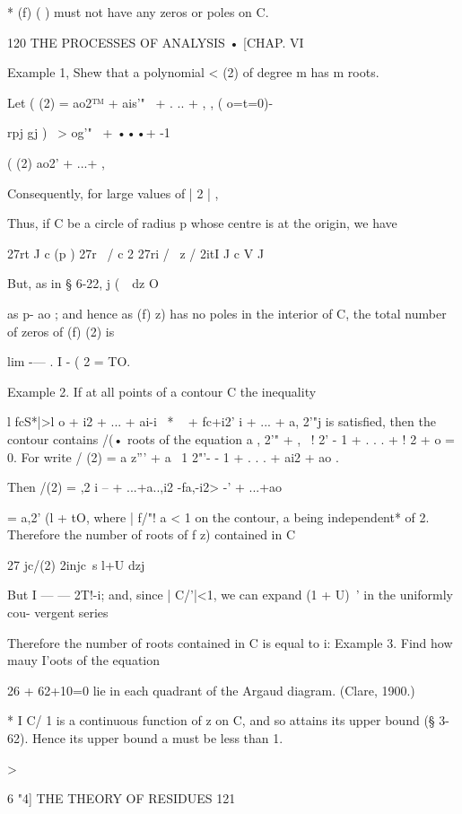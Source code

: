 {* (f) ( ) must not have any zeros or poles on C.



120 THE PROCESSES OF ANALYSIS • [CHAP. VI

Example 1, Shew that a polynomial < (2) of degree m has m roots.

Let ( (2) = ao2™ + ais'"~ + . .. + , , ( o=t=0)-

rpj gj ) \ > og'"~ + •••+ -1

( (2) ao2' + ...+ ,

Consequently, for large values of | 2 | ,

Thus, if C be a circle of radius p whose centre is at the origin, we
have

27rt J c (p ) 27r \ / c 2 27ri / \ z / 2itI J c V J

But, as in § 6-22, j (\ \ dz O

as p- ao ; and hence as (f) z) has no poles in the interior of C, the
total number of zeros of (f) (2) is

lim -— . I - ( 2 = TO.

Example 2. If at all points of a contour C the inequality

l fcS*|>l o + i2 + ... + ai-i~ * ~ + fc+i2' i + ... + a, 2'"j is
satisfied, then the contour contains /(• roots of the equation a , 2'"
+ , \ ! 2' - 1 + . . . + ! 2 + o = 0. For write / (2) = a z''' + a \ 1
2"'- - 1 + . . . + ai2 + ao .

Then /(2) = ,2 i -- + ...+a..,i2 -fa,-i2> -' + ...+ao\

= a,2' (l + tO, where | f/"! a < 1 on the contour, a being
independent* of 2. Therefore the number of roots of f z) contained in
C

27 jc/(2) 2injc\ s l+U dzj

But I — — 2T!-i; and, since | C/'|<1, we can expand (1 + U)~' in the
uniformly cou- vergent series

Therefore the number of roots contained in C is equal to i: Example 3.
Find how mauy I'oots of the equation

26 + 62+10=0 lie in each quadrant of the Argaud diagram. (Clare,
1900.)

* I C/ 1 is a continuous function of z on C, and so attains its upper
bound (§ 3-62). Hence its upper bound a must be less than 1.



>



6 "4] THE THEORY OF RESIDUES 121

}
